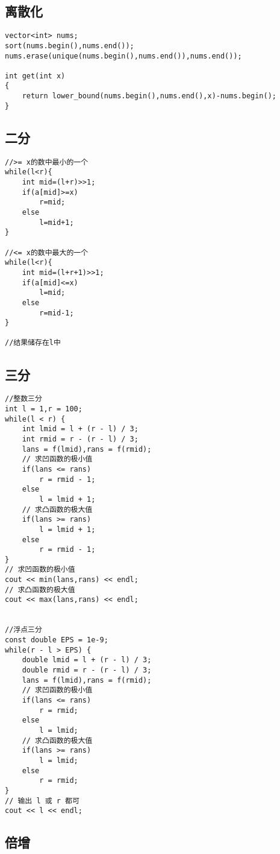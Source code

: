 \documentclass[twocolumn,a4]{article}
\begin{document}
\subsection{离散化}
\begin{lstlisting}
vector<int> nums;
sort(nums.begin(),nums.end());
nums.erase(unique(nums.begin(),nums.end()),nums.end());

int get(int x)
{
    return lower_bound(nums.begin(),nums.end(),x)-nums.begin();
}
\end{lstlisting}
\subsection{二分}
\begin{lstlisting}
//>= x的数中最小的一个
while(l<r){
    int mid=(l+r)>>1;
    if(a[mid]>=x)
        r=mid;
    else
        l=mid+1;
}

//<= x的数中最大的一个
while(l<r){
    int mid=(l+r+1)>>1;
    if(a[mid]<=x)
        l=mid;
    else
        r=mid-1;
}

//结果储存在l中
\end{lstlisting}

\subsection{三分}
\begin{lstlisting}
//整数三分
int l = 1,r = 100;
while(l < r) {
    int lmid = l + (r - l) / 3;
    int rmid = r - (r - l) / 3;
    lans = f(lmid),rans = f(rmid);
    // 求凹函数的极小值
    if(lans <= rans) 
        r = rmid - 1;
    else 
        l = lmid + 1;
    // 求凸函数的极大值
    if(lans >= rans) 
        l = lmid + 1;
    else 
        r = rmid - 1;
}
// 求凹函数的极小值
cout << min(lans,rans) << endl;
// 求凸函数的极大值
cout << max(lans,rans) << endl;


//浮点三分
const double EPS = 1e-9;
while(r - l > EPS) {
    double lmid = l + (r - l) / 3;
    double rmid = r - (r - l) / 3;
    lans = f(lmid),rans = f(rmid);
    // 求凹函数的极小值
    if(lans <= rans) 
        r = rmid;
    else 
        l = lmid;
    // 求凸函数的极大值
    if(lans >= rans) 
        l = lmid;
    else 
        r = rmid;
}
// 输出 l 或 r 都可
cout << l << endl;
\end{lstlisting}
\subsection{倍增}
\begin{lstlisting}

\end{lstlisting}
\end{document}
